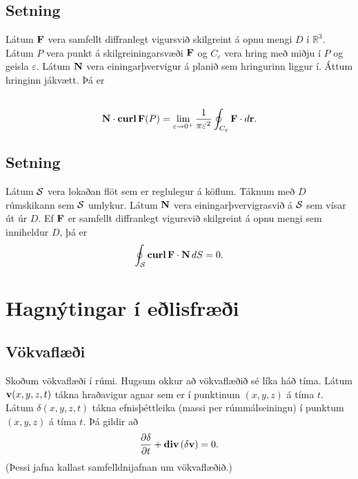 \documentclass[a4paper,10pt,icelandic]{sphinxmanual}
\begin{document}
\subsection{Setning}
\label{Kafli6:id12}
Látum \(\mbox{${\bf F}$}\) vera samfellt diffranlegt vigursvið
skilgreint á opnu mengi \(D\) í \({\mathbb  R}^3\). Látum
\(P\) vera punkt á skilgreiningarsvæði \(\mbox{${\bf F}$}\) og
\(C_\varepsilon\) vera hring með miðju í \(P\) og geisla
\(\varepsilon\). Látum \(\mbox{${\bf N}$}\) vera
einingarþvervigur á planið sem hringurinn liggur í. Áttum hringinn
jákvætt. Þá er
\begin{gather}
\begin{split}\displaystyle\end{split}\notag\\\begin{split}\mbox{${\bf N}$}\cdot\mbox{${\rm\bf curl\,}$}\mbox{${\bf F}$}(P)=\lim_{\varepsilon\rightarrow 0^+}
\frac{1}{\pi\varepsilon^2}\oint_{C_\varepsilon}\mbox{${\bf F}$}\cdot d\mbox{${\bf r}$}.\end{split}\notag
\end{gather}

\subsection{Setning}
\label{Kafli6:id13}
Látum \(\cal S\) vera lokaðan flöt sem er reglulegur á köflum.
Táknum með \(D\) rúmskikann sem \(\cal S\) umlykur. Látum
\(\mbox{${\bf N}$}\) vera einingarþvervigrasvið á \(\cal S\) sem
vísar út úr \(D\). Ef \(\mbox{${\bf F}$}\) er samfellt
diffranlegt vigursvið skilgreint á opnu mengi sem inniheldur \(D\),
þá er
\begin{gather}
\begin{split}\displaystyle \oint_{\cal S}\mbox{${\rm\bf curl\,}$}\mbox{${\bf F}$}\cdot\mbox{${\bf N}$}\,dS=0.\end{split}\notag
\end{gather}

\section{Hagnýtingar í eðlisfræði}
\label{Kafli6:hagnytingar-i-elisfraei}

\subsection{Vökvaflæði}
\label{Kafli6:vokvaflaei}
Skoðum vökvaflæði í rúmi. Hugsum okkur að vökvaflæðið sé líka háð tíma.
Látum \(\mbox{${\bf v}$}(x,y,z,t)\) tákna hraðavigur agnar sem er í
punktinum \((x,y,z)\) á tíma \(t\). Látum
\(\delta(x,y,z,t)\) tákna efnisþéttleika (massi per rúmmálseiningu)
í punktum \((x,y,z)\) á tíma \(t\). Þá gildir að
\begin{gather}
\begin{split}\displaystyle \frac{\partial \delta}{\partial t}+\mbox{${\rm\bf div\,}$}(\delta\mbox{${\bf v}$})=0.\end{split}\notag
\end{gather}
(Þessi jafna kallast samfelldnijafnan um vökvaflæðið.)
\end{document}
